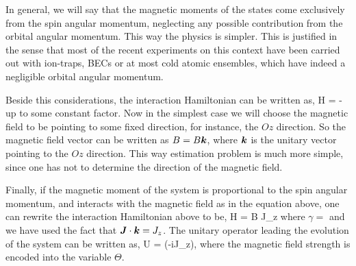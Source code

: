 In general, we will say that the magnetic moments of the states come exclusively from the spin angular momentum, neglecting any possible contribution from the orbital angular momentum.
This way the physics is simpler.
This is justified in the sense that most of the recent experiments on this context have been carried out with ion-traps, BECs or at most cold atomic ensembles, which have indeed a negligible orbital angular momentum.

Beside this considerations, the interaction Hamiltonian can be written as,
\be
  H = - \bs{\mu} \cdot {}
\ee
up to some constant factor.
Now in the simplest case we will choose the magnetic field to be pointing to some fixed direction, for instance, the $Oz$ direction.
So the magnetic field vector can be written as ${B}=B\boldsymbol{k}$, where $\boldsymbol{k}$ is the unitary vector pointing to the $Oz$ direction.
This way estimation problem is much more simple, since one has not to determine the direction of the magnetic field.

Finally, if the magnetic moment of the system is proportional to the spin angular momentum, and interacts with the magnetic field as in the equation above, one can rewrite the interaction Hamiltonian above to be,
\be
  H = \gamma B J_z
\ee
where $\gamma = $ and we have used the fact that $\boldsymbol{J}\cdot\boldsymbol{k}=J_z$.
The unitary operator leading the evolution of the system can be written as,
\be
  U = \exp(-i\Theta J_z),
\ee
where the magnetic field strength is encoded into the variable $\Theta$.
